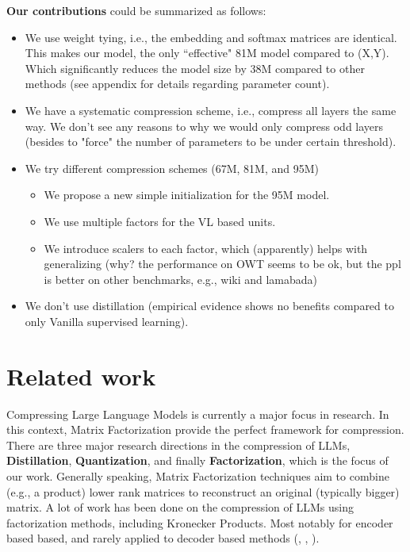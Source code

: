 \documentclass{article}
\begin{document}
\textbf{Our contributions} could be summarized as follows:
\begin{itemize}
    \item We use weight tying, i.e., the embedding and softmax matrices are identical. This makes our model, the only ``effective" 81M model compared to (X,Y). Which significantly reduces the model size by 38M compared to other methods (see appendix for details regarding parameter count).
    \item We have a systematic compression scheme, i.e., compress all layers the same way. We don't see any reasons to why we would only compress odd layers (besides to "force" the number of parameters to be under certain threshold).
    \item We try different compression schemes (67M, 81M, and 95M)
		\begin{itemize}
			\item We propose a new simple initialization for the 95M model.
			\item We use multiple factors for the VL based units.
			\item We introduce scalers to each factor, which (apparently) helps with generalizing (why? the performance on OWT seems to be ok, but the ppl is  better on other benchmarks, e.g., wiki and lamabada)

		\end{itemize}
    \item We don't use distillation (empirical evidence shows no benefits compared to only Vanilla supervised learning).
\end{itemize}

\section{Related work}%
\label{sec:Related work}

Compressing Large Language Models is currently a major focus in research. In this context, Matrix Factorization provide the perfect framework for compression. There are three major research directions in the compression of LLMs, \textbf{Distillation}, \textbf{Quantization}, and finally \textbf{Factorization}, which is the focus of our work. Generally speaking, Matrix Factorization techniques aim to combine (e.g., a product) lower rank matrices to reconstruct an original (typically bigger) matrix. A lot of work has been done on the compression of LLMs using factorization methods, including Kronecker Products. Most notably for encoder based based, and rarely applied to decoder based methods (\cite{tahaei2022kroneckerbert}, \cite{edalati2021kroneckr}, \cite{abronin2024tqcompressor}).
\end{document}
